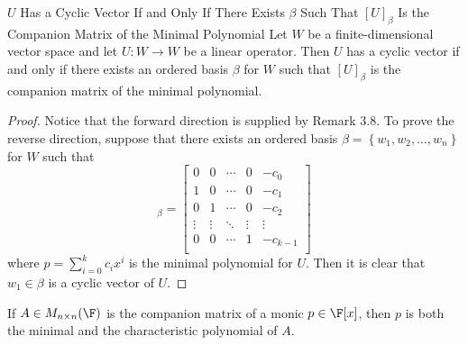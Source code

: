 \documentclass[linearalgebraII]{subfiles}
\begin{document}
    \clearpage
    \begin{theorem}{$U$ Has a Cyclic Vector If and Only If There Exists $\beta$ Such That $[U]_\beta$ Is the Companion Matrix of the Minimal Polynomial}
        Let $W$ be a finite-dimensional vector space and let $U:W\to W$ be a linear operator. Then $U$ has a cyclic vector if and only if there exists an ordered basis $\beta$ for $W$ such that $[U]_\beta$ is the companion matrix of the minimal polynomial.
    \end{theorem}

    \begin{proof}
        Notice that the forward direction is supplied by Remark 3.8. To prove the reverse direction, suppose that there exists an ordered basis $\beta = \left\lbrace w_1, w_2,\ldots, w_n \right\rbrace $ for $W$ such that
        \begin{equation*}
            [U]_\beta =
            \begin{bmatrix}
                0 & 0 & \cdots & 0 & -c_0 \\
                1 & 0 & \cdots & 0 & -c_1 \\
                0 & 1 & \cdots & 0 & -c_2 \\
                \vdots & \vdots & \ddots  & \vdots & \vdots \\
                0 & 0 & \cdots & 1 & -c_{k-1} \\
            \end{bmatrix}
        \end{equation*}
        where $p = \sum^{k}_{i=0} c_ix^i$ is the minimal polynomial for $U$. Then it is clear that $w_1\in\beta$ is a cyclic vector of $U$.
    \end{proof}

    \begin{cor}{}
        If $A\in M_{n\times n}(\F)$ is the companion matrix of a monic $p\in\F[x]$, then $p$ is both the minimal and the characteristic polynomial of $A$.
    \end{cor}	
\end{document}

